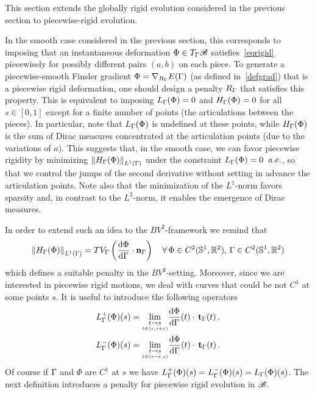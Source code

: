 This section extends the globally rigid evolution considered in the previous section to piecewise-rigid evolution.
\par In the smooth case considered in the previous section, this corresponds to imposing that an instantaneous deformation $\Phi \in T_\Gamma \mathcal{B}$  satisfies~\eqref{eqrigid} piecewisely for possibly different pairs $(a,b)$ on each piece.
To generate a piecewise-smooth Finsler gradient $\Phi = \nabla_{R_\Gamma} E(\Gamma)$ (as defined in~\eqref{defgrad}) that is a piecewise rigid deformation, one should design a penalty $R_\Gamma$ that satisfies this property. This is equivalent to imposing  
$L_\Gamma(\Phi) = 0$ and $H_\Gamma(\Phi) = 0$ for all $s \in [0,1]$ except for a finite number of points (the articulations between the pieces). In particular, note that $L_\Gamma(\Phi)$ is undefined at these points, while $H_\Gamma(\Phi)$ is the sum of Dirac measures concentrated at the  articulation points (due to the variations of $a$). This suggests that, in the smooth case, we can favor piecewise rigidity by minimizing $\left\| H_\Gamma(\Phi) \right\|_{L^1(\Gamma)}$ under the constraint $L_\Gamma(\Phi) = 0 \;\; a.e.$, so that  we control the jumps of the second derivative without setting in advance the articulation points. Note also that the minimization of the $L^1$-norm favors sparsity and, in contrast to the $L^2$-norm, it enables the emergence of Dirac measures.
\par In order to extend such an idea to the $BV^2$-framework we remind that 
$$\left\| H_\Gamma(\Phi) \right\|_{L^1(\Gamma)}=TV_\Gamma\left(\frac{\mathrm{d} \Phi}{\mathrm{d}\Gamma}\cdot \mathbf{n}_\Gamma\right)\quad \forall \,\Phi\in C^{2}(\mathbb{S}^1,\mathbb{R}^2),\, \Gamma \in C^2(\mathbb{S}^1, \mathbb{R}^2)$$
which defines a suitable penalty in the $BV^2$-setting.
Moreover, since we are interested in piecewise rigid motions, we  deal with curves that could be not  $C^1$ at some points $s$. It is useful to introduce the following operators
\begin{align}\label{eq-operator-L}
	L_\Gamma^+(\Phi)(s) &=	\underset{\underset{t\in(s,s+\varepsilon)}{t\rightarrow s}}{\lim} 
		\frac{\mathrm{d}\Phi}{\mathrm{d}\Gamma}(t) \cdot\, \mathbf{t}_\Gamma(t)\,, \\
	L_\Gamma^-(\Phi)(s) &=\underset{\underset{t\in(s-\varepsilon,s)}{t\rightarrow s}}{\lim} 
		\frac{\mathrm{d}\Phi}{\mathrm{d}\Gamma}(t) \cdot\, \mathbf{t}_\Gamma(t)\,.
\end{align}
Of course if $\Gamma$ and $\Phi$ are $C^1$ at $s$ we have $L_\Gamma^+(\Phi)(s)=L_\Gamma^-(\Phi)(s)=L_\Gamma(\Phi)(s)$. 
The next definition introduces a penalty for piecewise rigid evolution in $\mathcal{B}$.


